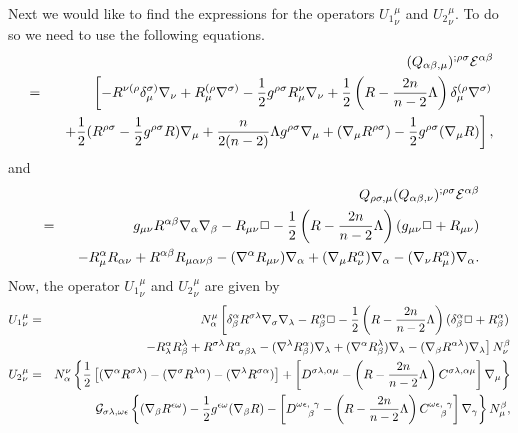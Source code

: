 \documentclass[a4paper,aps,preprint,groupedaddress,showpacs]{revtex4}
\begin{document}
Next we would like to find the expressions for the operators
${U_{1}}^{\mu}_{\nu}$ and ${U_{2}}^{\mu}_{\nu}$. To do so we need
to use the following equations.
\begin{eqnarray}
&&(Q_{\alpha\beta,\mu})^{;\rho\sigma}{\cal E}^{\alpha\beta}
\nonumber\\
&=&
\left[
-R^{\nu(\rho}\delta^{\sigma)}_{\mu}\nabla_{\nu}+
R^{(\rho}_{\mu}\nabla^{\sigma)}-
\frac{1}{2}g^{\rho\sigma}R^{\nu}_{\mu}\nabla_{\nu}+
\frac{1}{2}\left(R-\frac{2n}{n-2}\Lambda\right)
\delta^{(\rho}_{\mu}\nabla^{\sigma)}\right.
\nonumber\\
&&\ \ \left.
+\frac{1}{2}(R^{\rho\sigma}-\frac{1}{2}g^{\rho\sigma}R)\nabla_{\mu}+
\frac{n}{2(n-2)}\Lambda g^{\rho\sigma}\nabla_{\mu}+
(\nabla_{\mu}R^{\rho\sigma})-\frac{1}{2}g^{\rho\sigma}(\nabla_{\mu}R)
\right],
\end{eqnarray}
and
\begin{eqnarray}
&&Q_{\rho\sigma,\mu}(Q_{\alpha\beta,\nu})^{;\rho\sigma}
{\cal E}^{\alpha\beta}
\nonumber\\
&=&
g_{\mu\nu}R^{\alpha\beta}\nabla_{\alpha}\nabla_{\beta}-
R_{\mu\nu}\Box-
\frac{1}{2}\left(R-\frac{2n}{n-2}\Lambda\right)
(g_{\mu\nu}\Box+R_{\mu\nu})
\nonumber\\
&&\ \ -R^{\alpha}_{\mu}R_{\alpha\nu}+
R^{\alpha\beta}R_{\mu\alpha\nu\beta}-
(\nabla^{\alpha}R_{\mu\nu})\nabla_{\alpha}+
(\nabla_{\mu}R^{\alpha}_{\nu})\nabla_{\alpha}-
(\nabla_{\nu}R^{\alpha}_{\mu})\nabla_{\alpha}.
\end{eqnarray}
Now, the operator ${U_{1}}^{\mu}_{\nu}$ and ${U_{2}}^{\mu}_{\nu}$
are given by
\begin{eqnarray}
{U_{1}}^{\mu}_{\nu}
&=&N^{\mu}_{\alpha}\left[
\delta^{\alpha}_{\beta}
R^{\sigma\lambda}\nabla_{\sigma}\nabla_{\lambda}-
R^{\alpha}_{\beta}\Box-
\frac{1}{2}\left(R-\frac{2n}{n-2}\Lambda\right)
(\delta^{\alpha}_{\beta}\Box+R^{\alpha}_{\beta})\right.
\nonumber\\
&&\ \ \left.-R^{\alpha}_{\lambda}R^{\lambda}_{\beta}+
R^{\sigma\lambda}R^{\alpha}_{\ \sigma\beta\lambda}-
(\nabla^{\lambda}R^{\alpha}_{\beta})\nabla_{\lambda}+
(\nabla^{\alpha}R^{\lambda}_{\beta})\nabla_{\lambda}-
(\nabla_{\beta}R^{\alpha\lambda})\nabla_{\lambda}\right]
N^{\beta}_{\nu}
\\
{U_{2}}^{\mu}_{\nu}
&=&N^{\nu}_{\alpha}\left\{
\frac{1}{2}\left[
(\nabla^{\alpha}R^{\sigma\lambda})-
(\nabla^{\sigma}R^{\lambda\alpha})-
(\nabla^{\lambda}R^{\sigma\alpha})
\right]+
\left[
D^{\sigma\lambda,\alpha\mu}-
\left(R-\frac{2n}{n-2}\Lambda\right)
C^{\sigma\lambda,\alpha\mu}
\right]\nabla_{\mu}\right\}
\nonumber\\
&&\ \ {\cal G}_{\sigma\lambda,\omega\epsilon}
\left\{
(\nabla_{\beta}R^{\epsilon\omega})-
\frac{1}{2}g^{\epsilon\omega}(\nabla_{\beta}R)-
\left[
D^{\omega\epsilon,\ \gamma}_{\ \ \ \beta}-
\left(R-\frac{2n}{n-2}\Lambda\right)
C^{\omega\epsilon,\ \gamma}_{\ \ \ \beta}
\right]\nabla_{\gamma}
\right\}N^{\beta}_{\mu},
\end{eqnarray}
\end{document}
